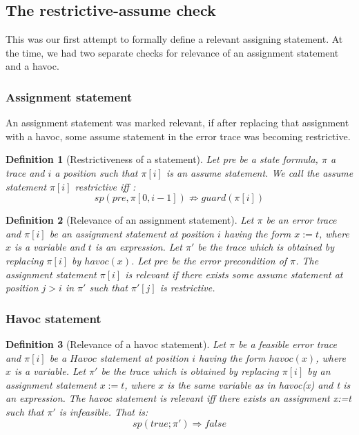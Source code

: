 \documentclass{article}
\newcommand{\limp}{\Rightarrow}
\newtheorem{mydef}{Definition}
\begin{document}
\subsection{The restrictive-assume check}
This was our first attempt to formally define a relevant assigning statement. At the time, we had two separate checks for relevance of an assignment statement and a havoc.
\subsubsection{Assignment statement}
An assignment statement was marked relevant, if after replacing that assignment with a havoc, some assume statement in the error trace was becoming restrictive.
\begin{mydef}[Restrictiveness of a statement]
Let pre be a state formula, $\pi$ a trace and $i$ a position such that $\pi[i]$ is an assume statement. We call the assume statement $\pi[i]$ \emph{restrictive} iff :
$$sp(pre, \pi[0,i-1]) \not \limp guard(\pi[i])$$
\end{mydef}

\begin{mydef}[Relevance of an assignment statement]
Let $\pi$ be an error trace and $\pi[i]$ be an assignment statement at position $i$ having the form $x:=t$, where $x$ is a variable and $t$ is an expression. Let $\pi'$ be the trace which is obtained by replacing $\pi[i]$ by  $havoc(x)$. Let $pre$ be the error precondition of $\pi$. The assignment statement $\pi[i]$ is \emph{relevant} if there exists some assume statement at position $j > i$ in $\pi'$ such that $\pi'[j]$ is restrictive. 
\end{mydef}

\subsubsection{Havoc statement}
\begin{mydef}[Relevance of a havoc statement]
Let $\pi$ be a feasible error trace and $\pi[i]$ be a $Havoc$ statement at position $i$ having the form $havoc(x)$, where $x$ is a variable. Let $\pi'$ be the trace which is obtained by replacing $\pi[i]$ by an assignment statement $x:=t$, where $x$ is the same variable as in havoc(x) and t is an expression. The havoc statement is \emph{relevant} iff there exists an assignment x:=t such that $\pi'$ is infeasible. That is:
$$sp(true; \pi') \Rightarrow false$$
\end{mydef}
\end{document}
